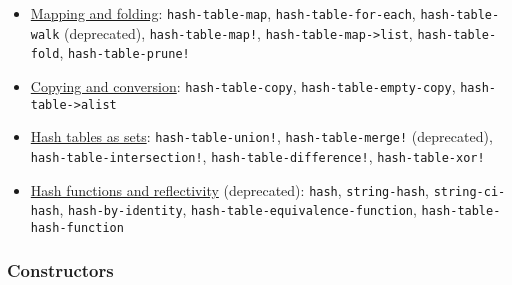\begin{itemize}
\tightlist
\item
  \href{http://srfi.schemers.org/srfi-125/srfi-125.html\#Mappingandfolding}{Mapping
  and folding}: \texttt{hash-table-map}, \texttt{hash-table-for-each},
  \texttt{hash-table-walk} (deprecated), \texttt{hash-table-map!},
  \texttt{hash-table-map-\textgreater{}list}, \texttt{hash-table-fold},
  \texttt{hash-table-prune!}
\end{itemize}

\begin{itemize}
\tightlist
\item
  \href{http://srfi.schemers.org/srfi-125/srfi-125.html\#Copyingandconversion}{Copying
  and conversion}: \texttt{hash-table-copy},
  \texttt{hash-table-empty-copy},
  \texttt{hash-table-\textgreater{}alist}
\end{itemize}

\begin{itemize}
\tightlist
\item
  \href{http://srfi.schemers.org/srfi-125/srfi-125.html\#Hashtablesassets}{Hash
  tables as sets}: \texttt{hash-table-union!},
  \texttt{hash-table-merge!} (deprecated),
  \texttt{hash-table-intersection!}, \texttt{hash-table-difference!},
  \texttt{hash-table-xor!}
\end{itemize}

\begin{itemize}
\tightlist
\item
  \href{http://srfi.schemers.org/srfi-125/srfi-125.html\#Hashfunctionsandreflectivity}{Hash
  functions and reflectivity} (deprecated): \texttt{hash},
  \texttt{string-hash}, \texttt{string-ci-hash},
  \texttt{hash-by-identity}, \texttt{hash-table-equivalence-function},
  \texttt{hash-table-hash-function}
\end{itemize}

\subsubsection{Constructors}\label{Constructors}

